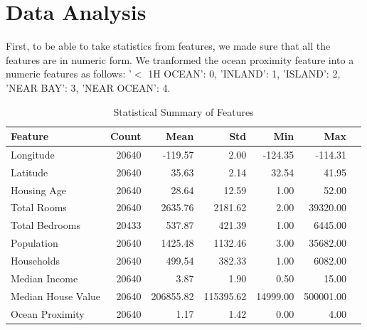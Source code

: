 \documentclass[a4paper, 11pt]{article}
\begin{document}
\section{Data Analysis}
First, to be able to take statistics from features, we made sure that all the features are in numeric form. We tranformed the ocean proximity feature into a numeric features as follows:
'$<$ 1H OCEAN': 0, 
'INLAND': 1, 
'ISLAND': 2, 
'NEAR BAY': 3, 
'NEAR OCEAN': 4.

\begin{table}[h!]
\centering
\caption{Statistical Summary of Features}
\begin{tabular}{lrrrrrr}
\toprule
\textbf{Feature} & \textbf{Count} & \textbf{Mean} & \textbf{Std} & \textbf{Min} & \textbf{Max} \\
\midrule
Longitude         & 20640 & -119.57 & 2.00 & -124.35 & -114.31 \\
Latitude          & 20640 & 35.63   & 2.14 & 32.54   & 41.95   \\
Housing Age       & 20640 & 28.64   & 12.59 & 1.00   & 52.00   \\
Total Rooms       & 20640 & 2635.76 & 2181.62 & 2.00 & 39320.00 \\
Total Bedrooms    & 20433 & 537.87  & 421.39 & 1.00   & 6445.00 \\
Population        & 20640 & 1425.48 & 1132.46 & 3.00  & 35682.00 \\
Households        & 20640 & 499.54  & 382.33 & 1.00   & 6082.00 \\
Median Income     & 20640 & 3.87    & 1.90 & 0.50    & 15.00   \\
Median House Value & 20640 & 206855.82 & 115395.62 & 14999.00 & 500001.00 \\
Ocean Proximity   & 20640 & 1.17    & 1.42 & 0.00    & 4.00    \\
\bottomrule
\end{tabular}
\end{table}
\end{document}
